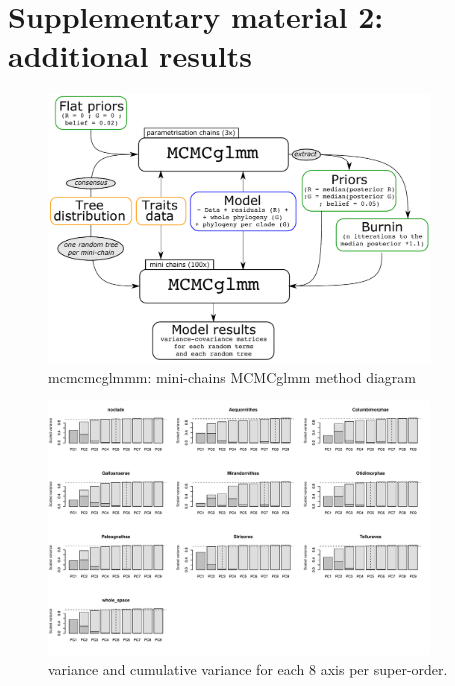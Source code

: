\documentclass[12pt,letterpaper]{article}
\begin{document}
\section{Supplementary material 2: additional results}

\begin{figure}[htbp]
\centering
   \includegraphics[width=0.9\textwidth]{Figures/mini-chains_diagram.pdf}
\caption{mcmcmcglmmm: mini-chains MCMCglmm method diagram}
\label{Fig:mcmcmcglmm}
\end{figure}

\begin{figure}[htbp]
\centering
   \includegraphics[width=0.9\textwidth]{Figures/axis_selection.pdf}
\caption{variance and cumulative variance for each 8 axis per super-order.}
\label{Fig:axes_variance}
\end{figure}
\end{document}
